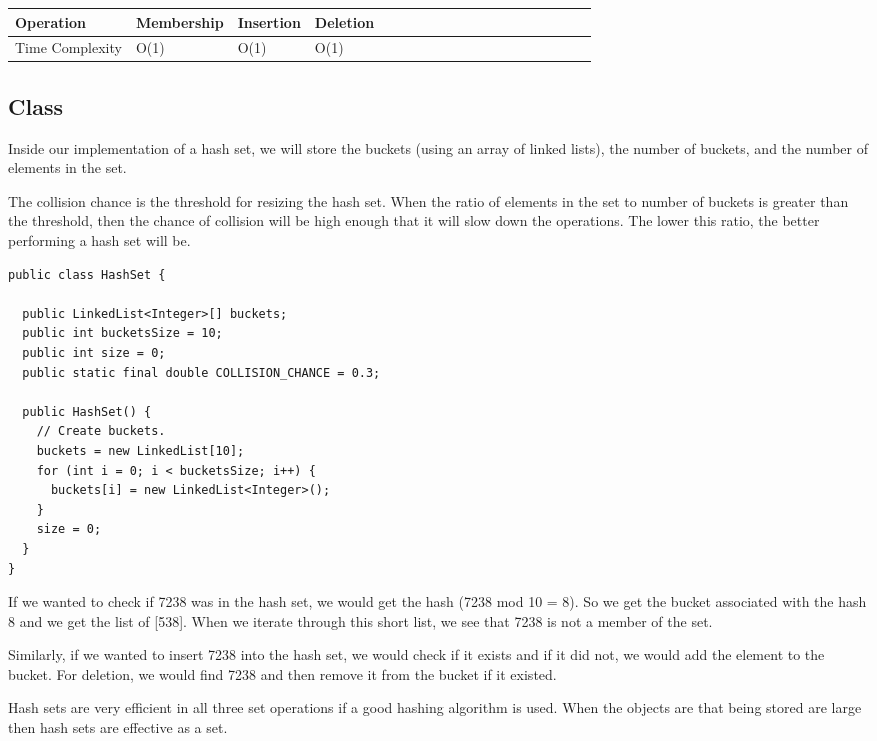 \documentclass[11pt,oneside]{book}
\begin{document}
\vspace{10px}\begin{tabulary}{0.4\linewidth}{|l|l|l|l|l|l|l|l|l|l|l|l|l|l|l|l|l|l|l}\hline


  Operation &
  Membership &
  Insertion &
  Deletion\\
\hline


  Time Complexity &
  O(1) &
  O(1) &
  O(1)\\

\hline\end{tabulary}

\subsection{Class}

Inside our implementation of a hash set, we will store the buckets (using an array of linked lists), the number of buckets, and the number of elements in the set.

The collision chance is the threshold for resizing the hash set. When the ratio of elements in the set to number of buckets is greater than the threshold, then the chance of collision will be high enough that it will slow down the operations. The lower this ratio, the better performing a hash set will be.

\begin{lstlisting}
public class HashSet {

  public LinkedList<Integer>[] buckets;
  public int bucketsSize = 10;
  public int size = 0;
  public static final double COLLISION_CHANCE = 0.3;

  public HashSet() {
    // Create buckets.
    buckets = new LinkedList[10];
    for (int i = 0; i < bucketsSize; i++) {
      buckets[i] = new LinkedList<Integer>();
    }
    size = 0;
  }
}
\end{lstlisting}

If we wanted to check if 7238 was in the hash set, we would get the hash (7238 mod 10 = 8). So we get the bucket associated with the hash 8 and we get the list of [538]. When we iterate through this short list, we see that 7238 is not a member of the set.

Similarly, if we wanted to insert 7238 into the hash set, we would check if it exists and if it did not, we would add the element to the bucket. For deletion, we would find 7238 and then remove it from the bucket if it existed.

Hash sets are very efficient in all three set operations if a good hashing algorithm is used. When the objects are that being stored are large then hash sets are effective as a set.
\end{document}
